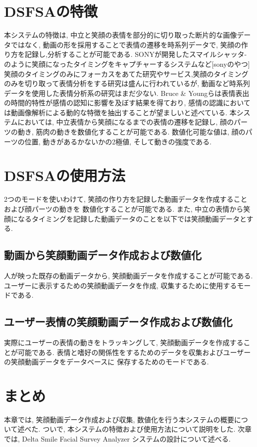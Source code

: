 \section{DSFSAの特徴}
本システムの特徴は, 中立と笑顔の表情を部分的に切り取った断片的な画像データではなく,
動画の形を採用することで表情の遷移を時系列データで, 笑顔の作り方を記録し,分析することが可能である.
SONYが開発したスマイルシャッタ-のように笑顔になったタイミングをキャプチャーするシステムなど[sonyのやつ]
笑顔のタイミングのみにフォーカスをあてた研究やサービス,笑顔のタイミングのみを切り取って表情分析をする研究は盛んに行われているが,
動画など時系列データを使用した表情分析系の研究はまだ少ない.
Bruce \& Youngらは表情表出の時間的特性が感情の認知に影響を及ぼす結果を得ており,
感情の認識においては動画像解析による動的な特徴を抽出することが望ましいと述べている.\cite{KOkata} \cite{yukiTakahasshi}
本システムにおいては, 中立表情から笑顔になるまでの表情の遷移を記録し,
顔のパーツの動き, 筋肉の動きを数値化することが可能である.
数値化可能な値は, 顔のパーツの位置, 動きがあるかないかの2極値, そして動きの強度である.

\section{DSFSAの使用方法}
2つのモードを使いわけて, 笑顔の作り方を記録した動画データを作成することおよび顔パーツの動きを
数値化することが可能である.
また, 中立の表情から笑顔になるタイミングを記録した動画データのことを以下では笑顔動画データとする.
\subsection{動画から笑顔動画データ作成および数値化}
人が映った既存の動画データから, 笑顔動画データを作成することが可能である.
ユーザーに表示するための笑顔動画データを作成, 収集するために使用するモードである.
\subsection{ユーザー表情の笑顔動画データ作成および数値化}
実際にユーザーの表情の動きをトラッキングして, 笑顔動画データを作成することが可能である.
表情と嗜好の関係性をするためのデータを収集およびユーザーの笑顔動画データをデータベースに
保存するためのモードである.

\section{まとめ}
本章では, 笑顔動画データ作成および収集, 数値化を行う本システムの概要について述べた.
ついで, 本システムの特徴および使用方法について説明をした.
次章では, Delta Smile Facial Survey Analyzer システムの設計について述べる.

